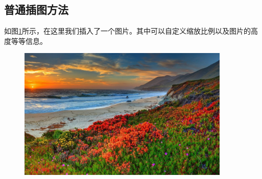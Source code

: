 \subsection{普通插图方法}
如图\ref{fig:my_pic1}所示，在这里我们插入了一个图片。其中可以自定义缩放比例以及图片的高度等等信息。
\begin{figure}[hbpt]
    \centering
    \includegraphics[width=0.9\textwidth]{figures/test.jpg}
    \label{fig:my_pic1}
\end{figure}
